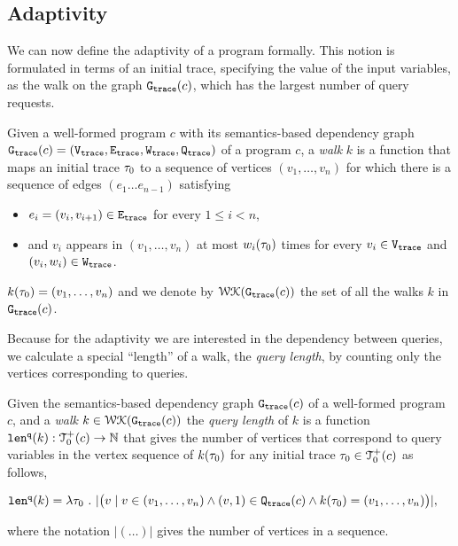 \subsection{Adaptivity}
We can now define the adaptivity of a program formally. This notion is formulated in terms of an initial trace, specifying the value of the input variables, as the walk on the graph $\mathtt{{G_{trace}}}({c})$, which has the largest number of query requests.


\begin{defn}[Walk]
\label{def:finitewalk}
Given a well-formed program $c$ with its semantics-based dependency graph $\mathtt{{G_{trace}}}({c}) = (\mathtt{{V_{trace}}}, \mathtt{{E_{trace}}}, \mathtt{{W_{trace}}}, \mathtt{{Q_{trace}}})$ of a program $c$, a \emph{walk} $k$ is a function that maps an initial trace $\mathtt{\tau}_0$ to a sequence of vertices $(v_1, \ldots, v_{n})$
for which there is a sequence of edges $(e_1 \ldots e_{n - 1})$  satisfying
\begin{itemize}
\item $e_i = (v_{i},v_{i + 1}) \in \mathtt{{E_{trace}}}$ for every $1 \leq i < n$,
\item and $v_i$ appears in $(v_1, \ldots, v_{n})$ at most $w_i(\mathtt{\tau}_0)$ times for every $v_i \in \mathtt{{V_{trace}}}$ and $(v_i, w_i) \in \mathtt{{W_{trace}}}$.  
\end{itemize}
$k(\mathtt{\tau}_0) = (v_1, \ldots, v_{n})$
and we denote by $\mathcal{WK}(\mathtt{{G_{trace}}}(c))$
the set of all the walks $k$ in $\mathtt{{G_{trace}}}(c)$.
\end{defn} 
Because for the adaptivity
we are interested in the dependency between queries,
we calculate a special ``length'' of a walk, the \emph{query length},  by counting only the vertices
corresponding to queries.
\begin{defn}
\label{def:qlen}
Given 
the semantics-based dependency graph $\mathtt{{G_{trace}}}({c})$ of a well-formed program $c$,
 and a \emph{walk} 
 $k \in \mathcal{WK}(\mathtt{{G_{trace}}}(c))$ 
the \emph{query length} of $k$ is a function $\mathtt{len}^{\tt q}(k):\mathcal{T}^{+}_0(c) \to \mathbb{N}$ that 
gives
the number of vertices that correspond to query variables in the vertex sequence of $k(\mathtt{\tau}_0)$
for any initial trace $\mathtt{\tau}_0 \in \mathcal{T}^{+}_0(c)$ as follows, 
\begin{center}
   $
  \mathtt{len}^{\tt q}(k) = \lambda \mathtt{\tau}_0 ~.~ |\big( v \mid v \in (v_1, \ldots, v_{n}) \land (v, 1) \in \mathtt{{Q_{trace}}}(c) 
  \land k(\mathtt{\tau}_0) = (v_1, \ldots, v_{n}) \big)|,
$
\end{center}
where the notation $| (\ldots) |$ gives the number of vertices in a sequence.
\end{defn}
